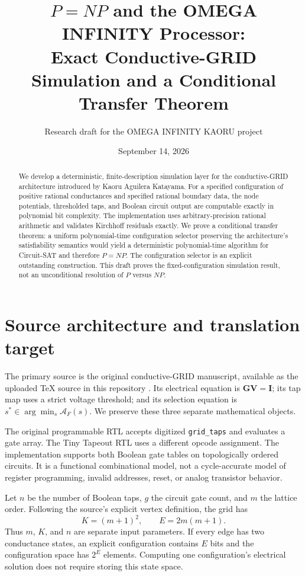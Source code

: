 \documentclass[11pt]{article}
\title{$P=NP$ and the OMEGA INFINITY Processor:\\
Exact Conductive-GRID Simulation and a Conditional Transfer Theorem}
\author{Research draft for the OMEGA INFINITY KAORU project}
\date{September 14, 2026}
\begin{document}
\maketitle
\begin{abstract}
We develop a deterministic, finite-description simulation layer for the
conductive-GRID architecture introduced by Kaoru Aguilera Katayama.
For a specified configuration of positive rational conductances and
specified rational boundary data, the node potentials, thresholded taps,
and Boolean circuit output are computable exactly in polynomial bit
complexity. The implementation uses arbitrary-precision rational
arithmetic and validates Kirchhoff residuals exactly. We prove a
conditional transfer theorem: a uniform polynomial-time configuration
selector preserving the architecture's satisfiability semantics would
yield a deterministic polynomial-time algorithm for Circuit-SAT and
therefore $P=NP$. The configuration selector is an explicit outstanding
construction. This draft proves the fixed-configuration simulation
result, not an unconditional resolution of $P$ versus $NP$.
\end{abstract}

\section{Source architecture and translation target}
The primary source is the original conductive-GRID manuscript, available
as the uploaded TeX source in this repository \cite{gridpaper}. Its
electrical equation is $\mathbf G\mathbf V=\mathbf I$; its tap map uses a
strict voltage threshold; and its selection equation is
$s^\ast\in\arg\min_s\mathcal A_F(s)$.
We preserve these three separate mathematical objects.

The original programmable RTL \cite{gridrtl} accepts digitized
\texttt{grid\_taps} and evaluates a gate array. The Tiny Tapeout RTL
\cite{beolrtl} uses a different opcode assignment. The implementation
supports both Boolean gate tables on topologically ordered circuits.
It is a functional combinational model, not a cycle-accurate model of
register programming, invalid addresses, reset, or analog transistor
behavior.

Let $n$ be the number of Boolean taps, $g$ the circuit gate count, and $m$
the lattice order. Following the source's explicit vertex definition,
the grid has
\[
K=(m+1)^2,\qquad E=2m(m+1).
\]
Thus $m$, $K$, and $n$ are separate input parameters. If every edge has
two conductance states, an explicit configuration contains $E$ bits and
the configuration space has $2^E$ elements. Computing one configuration's
electrical solution does not require storing this state space.
\end{document}
